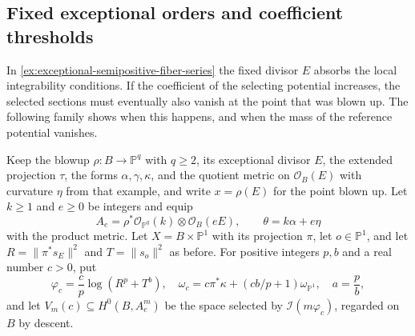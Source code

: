 \subsection{Fixed exceptional orders and coefficient thresholds}
\label{sec:exceptional-coefficient-thresholds}

In \cref{ex:exceptional-semipositive-fiber-series} the fixed divisor $E$ absorbs the local integrability conditions. If the coefficient of the selecting potential increases, the selected sections must eventually also vanish at the point that was blown up. The following family shows when this happens, and when the mass of the reference potential vanishes.

Keep the blowup $\rho\colon B\to\mathbb P^q$ with $q\geq2$, its exceptional divisor $E$, the extended projection $\tau$, the forms $\alpha,\gamma,\kappa$, and the quotient metric on $\mathcal O_B(E)$ with curvature $\eta$ from that example, and write $x=\rho(E)$ for the point blown up. Let $k\geq1$ and $e\geq0$ be integers and equip
\[
 A_e=\rho^*\mathcal O_{\mathbb P^q}(k)\otimes\mathcal O_B(eE),
 \qquad \theta=k\alpha+e\eta
\]
with the product metric. Let $X=B\times\mathbb P^1$ with its projection $\pi$, let $o\in\mathbb P^1$, and let $R=\|\pi^*s_E\|^2$ and $T=\|s_o\|^2$ as before. For positive integers $p,b$ and a real number $c>0$, put
\[
 \varphi_c=\frac cp\log(R^p+T^b),\quad
 \omega_c=c\pi^*\kappa+(cb/p+1)\omega_{\mathbb P^1},\quad
 a=\frac pb,
\]
and let $V_m(c)\subseteq H^0(B,A_e^m)$ be the space selected by $\mathcal I(m\varphi_c)$, regarded on $B$ by descent.

